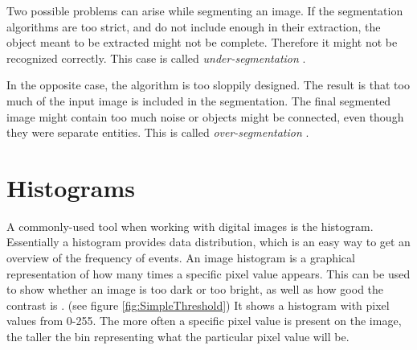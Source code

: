 Two possible problems can arise while segmenting an image. If the segmentation algorithms are too strict, and do not include enough in their extraction, the object meant to be extracted might not be complete. Therefore it might not be recognized correctly. This case is called \textit{under-segmentation} \citep{ip_book}.

In the opposite case, the algorithm is too sloppily designed. The result is that too much of the input image is included in the segmentation. The final segmented image might contain too much noise or objects might be connected, even though they were separate entities. This is called \textit{over-segmentation} \citep{ip_book}.

\section{Histograms}
A commonly-used tool when working with digital images is the histogram. Essentially a histogram provides data distribution, which is an easy way to get an overview of the frequency of events. An image histogram is a graphical representation of how many times a specific pixel value appears. This can be used to show whether an image is too dark or too bright, as well as how good the contrast is \citep{ip_book}. (see figure \ref{fig:SimpleThreshold}) It shows a histogram with pixel values from 0-255. The more often a specific pixel value is present on the image, the taller the bin representing what the particular pixel value will be.

